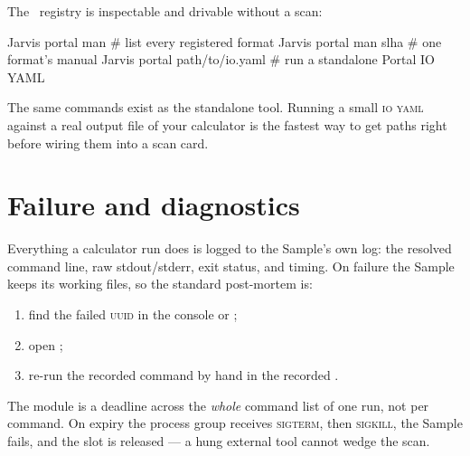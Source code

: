 The \Portal\ registry is inspectable and drivable without a scan:

\begin{terminal}
\begin{jcmd}
Jarvis portal man            # list every registered format
Jarvis portal man slha       # one format's manual
Jarvis portal path/to/io.yaml   # run a standalone Portal IO YAML
\end{jcmd}
\end{terminal}

The same commands exist as the standalone  tool. Running a small
\textsc{io yaml} against a real output file of your calculator is the fastest way to get
 paths right before wiring them into a scan card.

\section{Failure and diagnostics}
\label{sec:calc-failure}

Everything a calculator run does is logged to the Sample's own log: the resolved
command line, raw stdout/stderr, exit status, and timing. On failure the Sample keeps
its working files, so the standard post-mortem is:

\begin{enumerate}
  \item find the failed \textsc{uuid} in the console or ;
  \item open ;
  \item re-run the recorded command by hand in the recorded .
\end{enumerate}

\begin{jnote}
The module  is a deadline across the \emph{whole} command list of one
run, not per command. On expiry the process group receives \textsc{sigterm}, then
\textsc{sigkill}, the Sample fails, and the slot is released --- a hung external tool
cannot wedge the scan.
\end{jnote}
